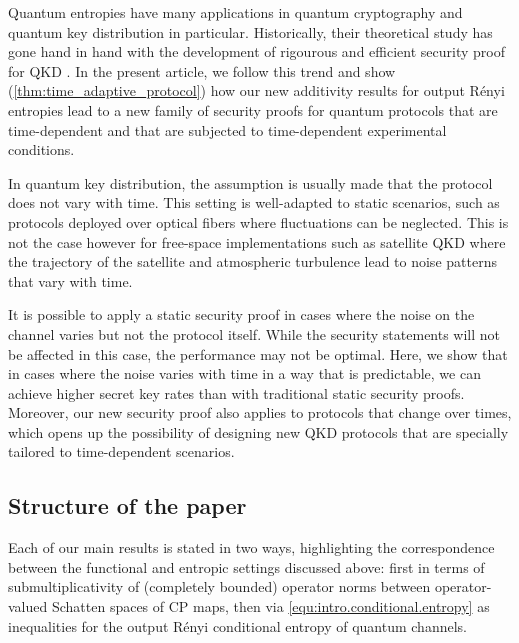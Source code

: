 \documentclass[11pt]{article}
\newcommand{\jk}[1]{\textcolor{cyan}{JK:~#1}}
\newcommand{\1}{\ensuremath{\mathbbm{1}}}
\theoremstyle{newdefinition}
\theoremstyle{newplain}
\theoremstyle{myplain}
\begin{document}
Quantum entropies have many applications in quantum cryptography and quantum key distribution \cite{Xu_2020} in particular. Historically, their theoretical study has gone hand in hand with the development of rigourous and efficient security proof for QKD \cite{Renner.2006, Arnon.2018,
Metger.2023,Himbeeck.2025}. In the present article, we follow this trend and show (\cref{thm:time_adaptive_protocol}) how our new additivity results for output Rényi entropies lead to a new family of security proofs for quantum protocols that are time-dependent and that are subjected to time-dependent experimental conditions. 

In quantum key distribution, the assumption is usually made that the protocol does not vary with time. This setting is well-adapted to static scenarios, such as protocols deployed over optical fibers where fluctuations can be neglected. This is not the case however for free-space implementations such as satellite QKD \cite{Liao_2017} where the trajectory of the satellite and atmospheric turbulence lead to noise patterns that vary with time. 

It is possible to apply a static security proof in cases where the noise on the channel varies but not the protocol itself. While the security statements will not be affected in this case, the performance may not be optimal. Here, we show that in cases where the noise varies with time in a way that is predictable, we can achieve higher secret key rates than with traditional static security proofs. Moreover, our new security proof also applies to protocols that change over times, which opens up the possibility of designing new QKD protocols that are specially tailored to time-dependent scenarios.  



\subsection{Structure of the paper}

Each of our main results is stated in two ways, highlighting the correspondence between the functional and entropic settings discussed above: first in terms of submultiplicativity of (completely bounded) operator norms between operator-valued Schatten spaces of CP maps, then via \eqref{equ:intro.conditional.entropy} as inequalities for the output Rényi conditional entropy of quantum channels.
\end{document}
